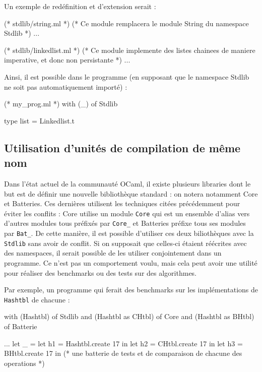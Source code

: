\documentclass[11pt,a4paper]{report}
\begin{document}
Un exemple de redéfinition et d'extension serait :
\begin{OCaml}
(* stdlib/string.ml *)
(* Ce module remplacera le module String du namespace Stdlib *)
...
\end{OCaml}

\begin{OCaml}
(* stdlib/linkedlist.ml *)
(* Ce module implemente des listes chainees de maniere imperative, et donc non
   persistante *)
...
\end{OCaml}

Ainsi, il est possible dans le programme (en supposant que le namespace Stdlib
ne soit pas automatiquement importé) :

\begin{OCaml}
(* my_prog.ml *)
with (_) of Stdlib

type list = Linkedlist.t
\end{OCaml}

\subsection{Utilisation d'unités de compilation de même nom}

Dans l'état actuel de la communauté OCaml, il existe plusieurs libraries dont le
but est de définir une nouvelle bibliothèque standard : on notera notamment Core
et Batteries. Ces dernières utilisent les techniques citées précédemment pour
éviter les conflits : Core utilise un module \texttt{Core} qui est un ensemble
d'alias vers d'autres modules tous préfixés par \texttt{Core_} et Batteries
préfixe tous ses modules par \texttt{Bat_}. De cette manière, il est possible
d'utiliser ces deux biliothèques avec la \texttt{Stdlib} sans avoir de
conflit. Si on supposait que celles-ci étaient réécrites avec des namespaces, il
serait possible de les utiliser conjointement dans un programme. Ce n'est pas un
comportement voulu, mais cela peut avoir une utilité pour réaliser des
benchmarks ou des tests sur des algorithmes.

Par exemple, un programme qui ferait des benchmarks sur les implémentations de
\texttt{Hashtbl} de chacune :
\begin{OCaml}
with (Hashtbl) of Stdlib
and (Hashtbl as CHtbl) of Core
and (Hashtbl as BHtbl) of Batterie

...
let _ =
  let h1 = Hashtbl.create 17 in
  let h2 = CHtbl.create 17 in
  let h3 = BHtbl.create 17 in
  (* une batterie de tests et de comparaison de chacune des operations *)
\end{OCaml}
\end{document}
